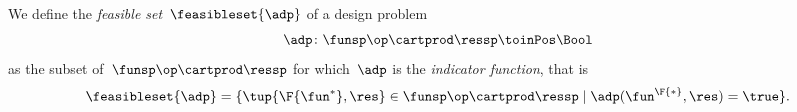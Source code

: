 


%
%


\begin{definition}
    \label{def:dp-feasible-set}
    We define the \emph{feasible set}~$\feasibleset{\adp}$ of a design problem~
    \begin{equation}
        \label{eq:generic-design-prob}
        \adp\colon \funsp\op \cartprod \ressp \toinPos \Bool
    \end{equation}
    as the subset of~$\funsp \op\cartprod \ressp$ for which~$\adp$ is the \emph{indicator function}, that is%
    \begin{equation}
        \label{eq:design-prob-as-upper-set}
        \feasibleset{\adp} = \{ \tup{\F{\fun^*},\res} \in \funsp \op\cartprod \ressp  \mid %
        \adp(\fun^\F{*}, \res) = \true %
        \}.
    \end{equation}
\end{definition}

